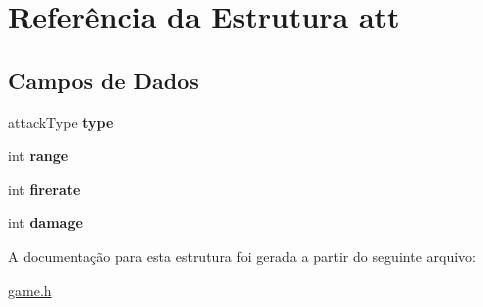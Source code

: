 \hypertarget{structatt}{
\section{Referência da Estrutura att}
\label{structatt}
}
\subsection*{Campos de Dados}
\begin{DoxyCompactItemize}
\item 
\hypertarget{structatt_afddb4eaa163c31ce59f5e1f6f47650f4}{
attackType {\bfseries type}}
\label{structatt_afddb4eaa163c31ce59f5e1f6f47650f4}

\item 
\hypertarget{structatt_a037e8e370380046bec287bdc96942091}{
int {\bfseries range}}
\label{structatt_a037e8e370380046bec287bdc96942091}

\item 
\hypertarget{structatt_a7b53939b690d58264414abe55f6b156b}{
int {\bfseries firerate}}
\label{structatt_a7b53939b690d58264414abe55f6b156b}

\item 
\hypertarget{structatt_a9b39867abc3f09243fcdc739bd9e6c90}{
int {\bfseries damage}}
\label{structatt_a9b39867abc3f09243fcdc739bd9e6c90}

\end{DoxyCompactItemize}


A documentação para esta estrutura foi gerada a partir do seguinte arquivo:\begin{DoxyCompactItemize}
\item 
\hyperlink{game_8h}{game.h}\end{DoxyCompactItemize}
